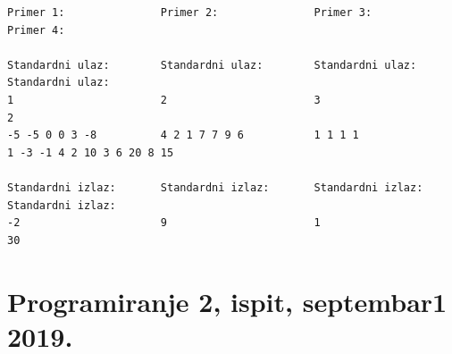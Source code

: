 \begin{enumerate}
\begin{verbatim}
Primer 1:               Primer 2:               Primer 3:               Primer 4:                

Standardni ulaz:        Standardni ulaz:        Standardni ulaz:        Standardni ulaz: 
1                       2                       3                       2 
-5 -5 0 0 3 -8          4 2 1 7 7 9 6           1 1 1 1                 1 -3 -1 4 2 10 3 6 20 8 15

Standardni izlaz:       Standardni izlaz:       Standardni izlaz:       Standardni izlaz:        
-2                      9                       1                       30 
\end{verbatim}  
\end{enumerate}

\section{Programiranje 2, ispit, septembar1 2019.}

